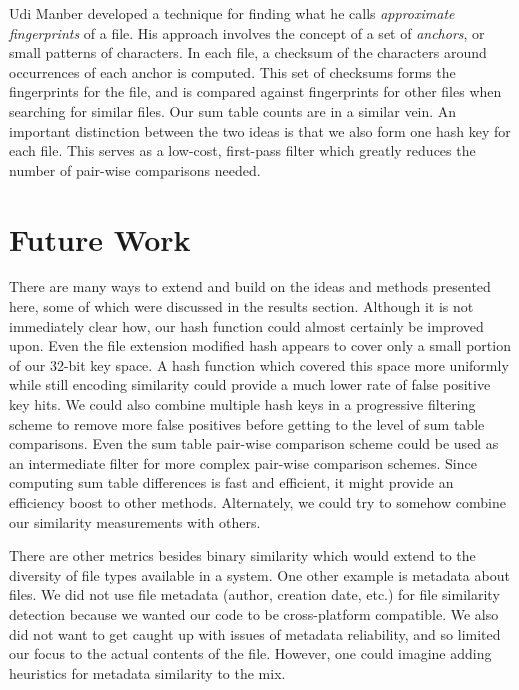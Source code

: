 \documentclass[10pt, twocolumn]{article}
\begin{document}
Udi Manber \cite{manber} developed a technique for finding what he calls \emph{approximate fingerprints} of a file. His approach involves the concept of a set of \emph{anchors}, or small patterns of characters. In each file, a checksum of the characters around occurrences of each anchor is computed. This set of checksums forms the fingerprints for the file, and is compared against fingerprints for other files when searching for similar files. Our sum table counts are in a similar vein. An important distinction between the two ideas is that we also form one hash key for each file.  This serves as a low-cost, first-pass filter which greatly reduces the number of pair-wise comparisons needed.



\section{Future Work}

There are many ways to extend and build on the ideas and methods presented here, some of which were discussed in the results section.  Although it is not immediately clear how, our hash function could almost certainly be improved upon.  Even the file extension modified hash appears to cover only a small portion of our 32-bit key space.  A hash function which covered this space more uniformly while still encoding similarity could provide a much lower rate of false positive key hits.  We could also combine multiple hash keys in a progressive filtering scheme to remove more false positives before getting to the level of sum table comparisons.  Even the sum table pair-wise comparison scheme could be used as an intermediate filter for more complex pair-wise comparison schemes.  Since computing sum table differences is fast and efficient, it might provide an efficiency boost to other methods.  Alternately, we could try to somehow combine our similarity measurements with others.

There are other metrics besides binary similarity which would extend to the diversity of file types available in a system. One other example is metadata about files. We did not use file metadata (author, creation date, etc.) for file similarity detection because we wanted our code to be cross-platform compatible. We also did not want to get caught up with issues of metadata reliability, and so limited our focus to the actual contents of the file. However, one could imagine adding heuristics for metadata similarity to the mix. 
\end{document}
